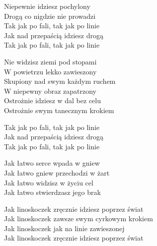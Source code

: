 \begin{text}
    Niepewnie idziesz pochylony\\
    Drogą co nigdzie nie prowadzi\\
    Tak jak po fali, tak jak po linie\\
    Jak nad przepaścią idziesz drogą\\
    Tak jak po fali, tak jak po linie

    Nie widzisz ziemi pod stopami\\
    W powietrzu lekko zawieszony\\
    Skupiony nad swym każdym ruchem\\
    W niepewny obraz zapatrzony\\
    Ostrożnie idziesz w dal bez celu\\
    Ostrożnie swym tanecznym krokiem

    Tak jak po fali, tak jak po linie\\
    Jak nad przepaścią idziesz drogą\\
    Tak jak po fali, tak jak po linie

    Jak łatwo serce wpada w gniew\\
    Jak łatwo gniew przechodzi w żart\\
    Jak łatwo widzisz w życiu cel\\
    Jak łatwo stwierdzasz jego brak

    Jak linoskoczek zręcznie idziesz poprzez świat\\
    Jak linoskoczek zawsze swym cyrkowym krokiem\\
    Jak linoskoczek jak na linie zawieszonej\\
    Jak linoskoczek zręcznie idziesz poprzez świat
\end{text}
\begin{chord}

\end{chord}